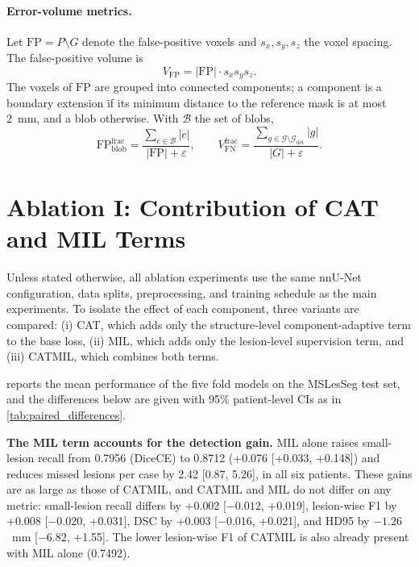 \paragraph{Error-volume metrics.}
Let $\mathrm{FP} = P \setminus G$ denote the false-positive voxels and
$s_x, s_y, s_z$ the voxel spacing. The false-positive volume is
\begin{equation}
V_{\mathrm{FP}} = |\mathrm{FP}| \cdot s_x s_y s_z.
\end{equation}
The voxels of $\mathrm{FP}$ are grouped into connected components; a
component is a boundary extension if its minimum distance to the reference
mask is at most 2~mm, and a blob otherwise. With $\mathcal{B}$ the set of
blobs,
\begin{equation}
\mathrm{FP}_{\mathrm{blob}}^{\mathrm{frac}}
= \frac{\sum_{c \in \mathcal{B}} |c|}{|\mathrm{FP}| + \varepsilon},
\qquad
V_{\mathrm{FN}}^{\mathrm{frac}}
= \frac{\sum_{g \in \mathcal{G} \setminus \mathcal{G}_{\mathrm{det}}} |g|}
{|G| + \varepsilon}.
\end{equation}

\section{Ablation I: Contribution of CAT and MIL Terms}
\label{appendix:catmil-components}

Unless stated otherwise, all ablation experiments use the same nnU-Net
configuration, data splits, preprocessing, and training schedule as the
main experiments. To isolate the effect of each component, three variants
are compared: (i) CAT, which adds only the structure-level
component-adaptive term to the base loss, (ii) MIL, which adds only the
lesion-level supervision term, and (iii) CATMIL, which combines both terms.

 reports the mean performance of the five fold
models on the MSLesSeg test set, and the differences below are given with
95\% patient-level CIs as in \cref{tab:paired_differences}.

\textbf{The MIL term accounts for the detection gain.} MIL alone raises
small-lesion recall from 0.7956 (DiceCE) to 0.8712 (+0.076 [+0.033,
+0.148]) and reduces missed lesions per case by 2.42 [0.87, 5.26], in all
six patients. These gains are as large as those of CATMIL, and CATMIL and
MIL do not differ on any metric: small-lesion recall differs by +0.002
[$-0.012$, +0.019], lesion-wise F1 by +0.008 [$-0.020$, +0.031], DSC by
+0.003 [$-0.016$, +0.021], and HD95 by $-1.26$~mm [$-6.82$, +1.55]. The
lower lesion-wise F1 of CATMIL is also already present with MIL alone
(0.7492).


